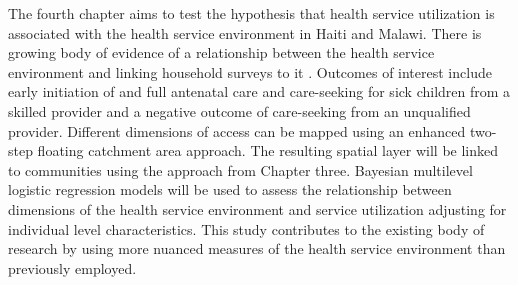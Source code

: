 The fourth chapter aims to test the hypothesis that health service utilization is associated with the health service environment in Haiti and Malawi. There is growing body of evidence of a relationship between the health service environment and linking household surveys to it \autocite{gao_understanding_2019, gage_does_2018, sochas_predictive_2020}. Outcomes of interest include early initiation of and full antenatal care and care-seeking for sick children from a skilled provider and a negative outcome of care-seeking from an unqualified provider. Different dimensions of access can be mapped using an enhanced two-step floating catchment area approach. The resulting spatial layer will be linked to communities using the approach from Chapter three. Bayesian multilevel logistic regression models will be used to assess the relationship between dimensions of the health service environment and service utilization adjusting for individual level characteristics. This study contributes to the existing body of research by using more nuanced measures of the health service environment than previously employed.
